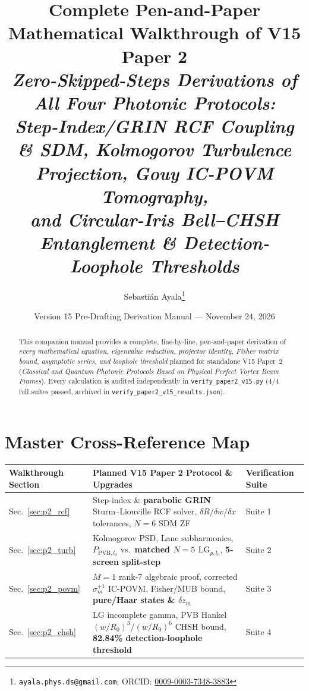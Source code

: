 \documentclass[10pt,letterpaper]{article}
\title{\vspace{-1.0cm}\textbf{\Large Complete Pen-and-Paper Mathematical Walkthrough of V15 Paper 2}\\[0.35em]
\large\textit{Zero-Skipped-Steps Derivations of All Four Photonic Protocols:\\
Step-Index/GRIN RCF Coupling \& SDM, Kolmogorov Turbulence Projection, Gouy IC-POVM Tomography,\\
and Circular-Iris Bell--CHSH Entanglement \& Detection-Loophole Thresholds}}
\author{Sebasti\'an Ayala\thanks{\texttt{ayala.phys.ds@gmail.com}; ORCID: \href{https://orcid.org/0009-0003-7348-3883}{0009-0003-7348-3883}}}
\date{Version 15 Pre-Drafting Derivation Manual --- November 24, 2026}
\numberwithin{equation}{section}
\begin{document}
\maketitle
\thispagestyle{plain}

\begin{abstract}
\noindent This companion manual provides a complete, line-by-line, pen-and-paper derivation of \emph{every mathematical equation, eigenvalue reduction, projector identity, Fisher matrix bound, asymptotic series, and loophole threshold} planned for standalone V15 Paper~2 (\emph{Classical and Quantum Photonic Protocols Based on Physical Perfect Vortex Beam Frames}). Every calculation is audited independently in \texttt{verify\_paper2\_v15.py} (4/4 full suites passed, archived in \texttt{verify\_paper2\_v15\_results.json}).
\end{abstract}

\tableofcontents
\vspace{0.5em}

\section*{Master Cross-Reference Map}

\begin{table}[h]
\centering
\scriptsize
\renewcommand{\arraystretch}{1.15}
\setlength{\tabcolsep}{4pt}
\begin{tabular}{@{}lll@{}}
\toprule
\textbf{Walkthrough Section} & \textbf{Planned V15 Paper 2 Protocol \& Upgrades} & \textbf{Verification Suite} \\
\midrule
Sec.~\ref{sec:p2_rcf} & Step-index \& \textbf{parabolic GRIN} Sturm--Liouville RCF solver, $\delta R/\delta w/\delta x$ tolerances, $N=6$ SDM ZF & Suite 1 \\
Sec.~\ref{sec:p2_turb} & Kolmogorov PSD, Lane subharmonics, $P_{\mathrm{PVB},l_0}$ vs.\ \textbf{matched $N=5$ $\mathrm{LG}_{p,l_0}$}, \textbf{5-screen split-step} & Suite 2 \\
Sec.~\ref{sec:p2_povm} & $M=1$ rank-7 algebraic proof, corrected $\sigma_m^{+1}$ IC-POVM, Fisher/MUB bound, \textbf{pure/Haar states \& $\delta z_m$} & Suite 3 \\
Sec.~\ref{sec:p2_chsh} & LG incomplete gamma, PVB Hankel $(w/R_0)^3$/$(w/R_0)^6$ CHSH bound, \textbf{82.84\% detection-loophole threshold} & Suite 4 \\
\bottomrule
\end{tabular}
\end{table}
\end{document}
